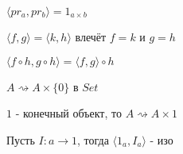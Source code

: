 \begin{task}
  $\langle pr_a, pr_b \rangle = 1_{a \times b}$
\end{task}

\begin{task}
  $\langle f, g \rangle = \langle k, h \rangle$ влечёт $f = k$ и $g = h$
\end{task}

\begin{task}
  $\langle f \circ h, g \circ h \rangle = \langle f, g \rangle \circ h$
\end{task}

\begin{task}
  $A \rightsquigarrow A \times \{0\}$ в $Set$
\end{task}

\begin{task}
  $1$ - конечный объект, то $A \rightsquigarrow A \times 1$
\end{task}

\begin{task}
  Пусть $I \colon a \to 1$, тогда $\langle 1_a, I_a \rangle$ - изо
\end{task}



